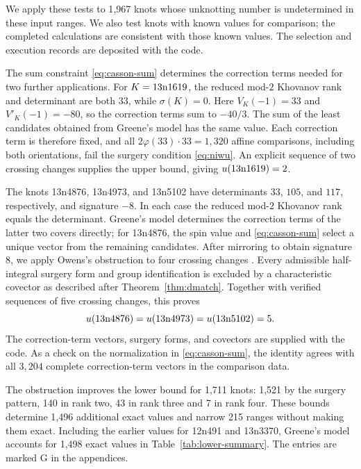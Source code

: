 \documentclass[12pt, oneside]{amsart}
\newcommand{\kn}[2]{\textup{#1#2}}
\newcommand{\nSweepExact}{1{,}498}
\newcommand{\nSweepImproved}{215}
\newcommand{\nSweepNewExact}{1{,}496}
\newcommand{\nSweepObstructed}{1{,}711}
\newcommand{\nSweepRankFour}{7}
\newcommand{\nSweepRankThree}{43}
\newcommand{\nSweepRankTwo}{140}
\newcommand{\nSweepTargets}{1{,}967}
\newcommand{\nSweepUone}{1{,}521}
\begin{document}
We apply these tests to \nSweepTargets{} knots whose unknotting number is
undetermined in these input ranges. We also test knots with known values for comparison;
the completed calculations are consistent with those known values. The
selection and execution records are deposited with the code.

The sum constraint \eqref{eq:casson-sum} determines the correction terms
needed for two further applications. For $K=\kn{13n}{1619}$, the reduced
mod-$2$ Khovanov rank and determinant are both $33$, while $\sigma(K)=0$.
Here $V_K(-1)=33$ and $V'_K(-1)=-80$, so the correction terms sum to
$-40/3$. The sum of the least candidates obtained from Greene's model has
the same value. Each correction term is therefore fixed, and all
$2\varphi(33)\cdot33=1{,}320$ affine comparisons, including both
orientations, fail the surgery condition \eqref{eq:niwu}. An explicit
sequence of two crossing changes supplies the upper bound, giving
$u(\kn{13n}{1619})=2$.

The knots \kn{13n}{4876}, \kn{13n}{4973}, and \kn{13n}{5102} have determinants
$33$, $105$, and $117$, respectively, and signature $-8$. In each case the
reduced mod-$2$ Khovanov rank equals the determinant. Greene's model
determines the correction terms of the latter two covers directly; for
\kn{13n}{4876}, the spin value and \eqref{eq:casson-sum} select a unique
vector from the remaining candidates. After mirroring to obtain signature
$8$, we apply Owens's obstruction to four crossing changes
\cite[Thm.~5]{Owens}. Every admissible half-integral surgery form and group
identification is excluded by a characteristic covector as described after
Theorem~\ref{thm:dmatch}. Together with verified sequences of five crossing
changes, this proves
\[
    u(\kn{13n}{4876})=u(\kn{13n}{4973})=u(\kn{13n}{5102})=5.
\]
The correction-term vectors, surgery forms, and covectors are supplied with
the code. As a check on the normalization in \eqref{eq:casson-sum}, the
identity agrees with all $3{,}204$ complete correction-term vectors in the
comparison data.

The obstruction improves the lower bound for \nSweepObstructed{} knots:
\nSweepUone{} by the
surgery pattern, \nSweepRankTwo{} in rank two, \nSweepRankThree{} in rank three
and \nSweepRankFour{} in rank four. These bounds determine
\nSweepNewExact{} additional exact values and narrow \nSweepImproved{} ranges
without making them exact. Including the earlier values for \kn{12n}{491} and
\kn{13n}{3370}, Greene's model accounts for \nSweepExact{} exact values in
Table~\ref{tab:lower-summary}. The entries are marked $\mathrm{G}$ in the
appendices.
\end{document}
